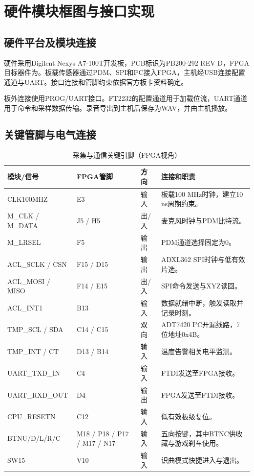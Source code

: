 \chapter{硬件模块框图与接口实现}
\section{硬件平台及模块连接}
硬件采用Digilent Nexys A7-100T开发板，PCB标识为PB200-292 REV D，FPGA目标器件为。板载传感器通过PDM、SPI和I²C接入FPGA，主机经USB连接配置通道与UART。接口连接和管脚约束依据官方板卡资料确定\cite{rm,xdc,sch}。



板外连接使用PROG/UART接口。FT2232的配置通道用于加载位流，UART通道用于命令和采样数据传输。录音导出到主机后保存为WAV，并由主机播放。

\section{关键管脚与电气连接}
\begin{table}[H]\centering\caption{采集与通信关键引脚（FPGA视角）}\footnotesize\renewcommand{\arraystretch}{1.12}
\begin{tabularx}{\linewidth}{p{29mm}p{30mm}p{12mm}Y}\toprule
模块/信号 & FPGA管脚 & 方向 & 连接和职责\\\midrule
CLK100MHZ & E3 & 输入 & 板载100 MHz时钟，建立10 ns周期约束。\\
M\_CLK / M\_DATA & J5 / H5 & 出/入 & 麦克风时钟与PDM比特流。\\
M\_LRSEL & F5 & 输出 & PDM通道选择固定为0。\\
ACL\_SCLK / CSN & F15 / D15 & 输出 & ADXL362 SPI时钟与低有效片选。\\
ACL\_MOSI / MISO & F14 / E15 & 出/入 & SPI命令发送与XYZ读回。\\
ACL\_INT1 & B13 & 输入 & 数据就绪中断，触发读取并记录时刻。\\
TMP\_SCL / SDA & C14 / C15 & 双向 & ADT7420 I²C开漏线路，7位地址0x4B。\\
TMP\_INT / CT & D13 / B14 & 输入 & 温度告警相关电平监测。\\
{\footnotesize UART\_TXD\_IN} & C4 & 输入 & FTDI发送至FPGA接收。\\
{\footnotesize UART\_RXD\_OUT} & D4 & 输出 & FPGA发送至FTDI接收。\\
CPU\_RESETN & C12 & 输入 & 低有效板级复位。\\
BTNU/D/L/R/C & M18 / P18 / P17 / M17 / N17 & 输入 & 五向按键，其中BTNC供收藏与游戏刹车使用。\\
SW15 & V10 & 输入 & 识曲模式快捷进入与退出。\\\bottomrule
\end{tabularx}\end{table}

